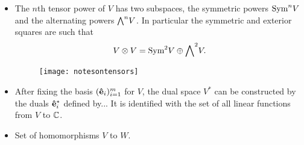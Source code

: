 \begin{itemize}
			\item The $n$th tensor power of $V$ has two subspaces, the symmetric powers $\text{Sym}^n V$ and the alternating powers ${\bigwedge}^n V$. In particular the symmetric and exterior squares are such that
			\begin{align*}
				V \otimes V = \text{Sym}^2 V \oplus {\bigwedge}^2 V.
			\end{align*}
			
			\begin{figure}[hbt!]
				\centering
				\texttt{[image: notesontensors]}
				\caption{}
				\label{fig:notesontensors}
			\end{figure}
			
			
			\item After fixing the basis $(\mathbf{\hat{e}}_i)_{i=1}^m$ for $V$, the dual space $V^*$ can be constructed by the duals $\mathbf{\hat{e}}_i^*$ defined by... It is identified with the set of all linear functions from $V$ to $\mathbb{C}$.
			
			\item Set of homomorphisms $V$ to $W$.
			
		\end{itemize} 
		
	

		
		
		
